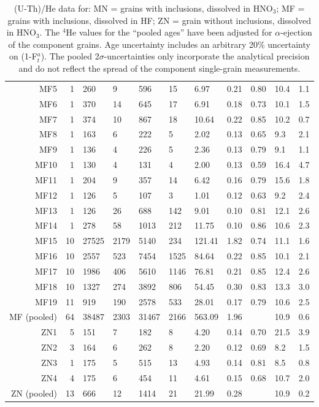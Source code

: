 \documentclass{article}
\begin{document}
\begin{table}[here]
\begin{tabular}{rrlllllllll}
  MF5 & 1 & 260 & 9 & 596 & 15 & 6.97 & 0.21 & 0.80 & 10.4 & 1.1 \\
  MF6 & 1 & 370 & 14 & 645 & 17 & 6.91 & 0.18 & 0.73 & 10.1 & 1.5 \\
  MF7 & 1 & 374 & 10 & 867 & 18 & 10.64 & 0.22 & 0.85 & 10.2 & 0.7 \\
  MF8 & 1 & 163 & 6 & 222 & 5 & 2.02 & 0.13 & 0.65 & 9.3 & 2.1 \\
  MF9 & 1 & 136 & 4 & 226 & 5 & 2.36 & 0.13 & 0.79 & 9.1 & 1.1 \\
  MF10 & 1 & 130 & 4 & 131 & 4 & 2.00 & 0.13 & 0.59 & 16.4 & 4.7 \\
  MF11 & 1 & 204 & 9 & 357 & 14 & 6.42 & 0.16 & 0.79 & 15.6 & 1.8 \\
 MF12 & 1 & 126 & 5 & 107 & 3 & 1.01 & 0.12 & 0.63 & 9.2 & 2.4 \\
 MF13 & 1 & 126 & 26 & 688 & 142 & 9.01 & 0.10 & 0.81 & 12.1 & 2.6 \\
 MF14 & 1 & 278 & 58 & 1013 & 212 & 11.75 & 0.10 & 0.86 & 10.6 & 2.3 \\
 MF15 & 10 & 27525 & 2179 & 5140 & 234 &  121.41 & 1.82 & 0.74 & 11.1 & 1.6 \\
 MF16 & 10 & 2557 & 523 & 7454 & 1525 & 84.64 & 0.22 & 0.85 & 10.1 & 2.1 \\
 MF17 & 10 & 1986 & 406 & 5610 & 1146 & 76.81 & 0.21 & 0.85 & 12.4 & 2.6 \\
 MF18 & 10 & 1327 & 274 & 3892 & 806 & 54.45 & 0.30 & 0.83 & 13.3 & 3.0 \\
 MF19 & 11 & 919 & 190 & 2578 & 533 & 28.01 & 0.17 & 0.79 & 10.6 & 2.5 \\
\hline
MF (pooled) & 64 & 38487 & 2303 & 31467 & 2166 &  563.09 & 1.96 & & 10.9 & 0.6 \\
\hline
\hline
  ZN1 & 5 & 151 & 7 & 182 & 8 & 4.20 & 0.14 & 0.70 & 21.5 & 3.9 \\
  ZN2 & 3 & 164 & 6 & 262 & 8 & 2.20 & 0.12 & 0.69 & 8.2 & 1.5 \\
  ZN3 & 1 & 175 & 5 & 515 & 13 & 4.93 & 0.14 & 0.81 & 8.5 & 0.8 \\
  ZN4 & 4 & 175 & 6 & 454 & 11 & 4.61 & 0.15 & 0.68 & 10.7 & 2.0 \\
\hline
ZN (pooled) & 13 & 666 & 12 & 1414 & 21 & 21.99 & 0.28 & & 10.9 & 0.2 \\
\hline
\hline
\end{tabular}
\caption{
(U-Th)/He data for: MN = grains with inclusions, dissolved in HNO$_3$;
MF = grains with inclusions, dissolved in HF; ZN = grain without
inclusions, dissolved in HNO$_ 3$. The $^4$He values for the ``pooled
ages'' have been adjusted for $\alpha$-ejection of the component
grains. Age uncertainty includes an arbitrary 20\% uncertainty on
(1-F$_t^a$). The pooled 2$\sigma$-uncertainties only incorporate the
analytical precision and do not reflect the spread of the component
single-grain measurements.}
 \label{tab:UThHe}
\end{table}
\end{document}
